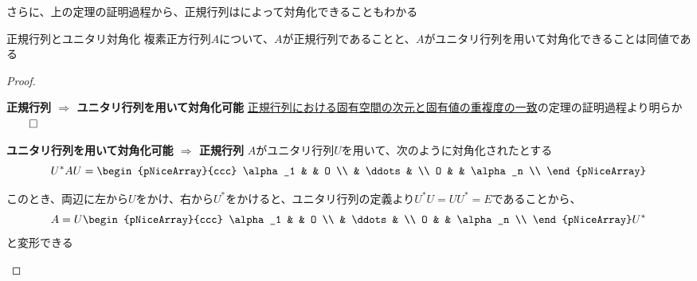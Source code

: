 \documentclass[../../../topic_linear-algebra]{subfiles}
\begin{document}
さらに、上の定理の証明過程から、正規行列はによって対角化できることもわかる

\begin{theorem}{正規行列とユニタリ対角化}
  複素正方行列$A$について、$A$が正規行列であることと、$A$がユニタリ行列を用いて対角化できることは同値である
\end{theorem}

\begin{proof}
  \begin{subpattern}{\bfseries 正規行列 $\Longrightarrow$ ユニタリ行列を用いて対角化可能}
    \hyperref[thm:normal-matrix-eigenvalue-multiplicity]{正規行列における固有空間の次元と固有値の重複度の一致}の定理の証明過程より明らか $\qed$
  \end{subpattern}

  \begin{subpattern}{\bfseries ユニタリ行列を用いて対角化可能 $\Longrightarrow$ 正規行列}
    $A$がユニタリ行列$U$を用いて、次のように対角化されたとする
    \begin{equation*}
      U^* AU =  \begin{pNiceArray}{ccc}
        \alpha_1 & & O \\
        &  \ddots & \\
        O & & \alpha_n \\
      \end{pNiceArray}
    \end{equation*}

    このとき、両辺に左から$U$をかけ、右から$U^*$をかけると、ユニタリ行列の定義より$U^*U = UU^* = E$であることから、
    \begin{equation*}
      A = U \begin{pNiceArray}{ccc}
        \alpha_1 & & O \\
        &  \ddots & \\
        O & & \alpha_n \\
      \end{pNiceArray} U^*
    \end{equation*}
    と変形できる

    \br


\end{subpattern}
\end{proof}
\end{document}
